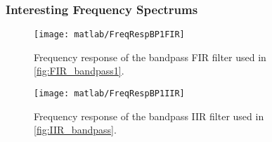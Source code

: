 \subsubsection{Interesting Frequency Spectrums}

\begin{figure}[!htb]
	\centering
	\texttt{[image: matlab/FreqRespBP1FIR]}
	\caption{Frequency response of the bandpass FIR filter used in \cref{fig:FIR_bandpass1}.}
	\label{fig:FIR_BP1freqz}
\end{figure}

\begin{figure}[!htb]
	\centering
	\texttt{[image: matlab/FreqRespBP1IIR]}
	\caption{Frequency response of the bandpass IIR filter used in \cref{fig:IIR_bandpass}.}
	\label{fig:IIR_BP1freqz}
\end{figure}